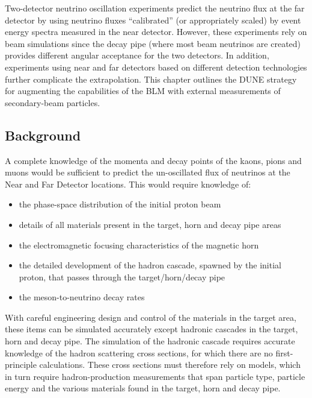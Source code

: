 Two-detector neutrino oscillation experiments predict the neutrino
flux at the far detector by using neutrino fluxes ``calibrated'' (or
appropriately scaled) by event energy spectra measured in the near
detector. However, these experiments rely on beam simulations since
the decay pipe (where most beam neutrinos are created) provides
different angular acceptance for the two detectors. In addition,
experiments using near and far detectors based on different detection
technologies further complicate the extrapolation. This chapter
outlines the DUNE strategy for augmenting the capabilities of the BLM
with external measurements of secondary-beam particles.

\subsection{Background}

A complete knowledge of the momenta and decay points of the kaons, pions and
muons would be sufficient to  predict the un-oscillated flux of neutrinos
at the Near and Far Detector locations. This would require knowledge of:

\begin{itemize}
\item the phase-space distribution of the initial proton beam
\item details of all materials present in the target, horn and decay pipe areas
\item  the electromagnetic focusing characteristics of the magnetic horn
\item the detailed development of the hadron cascade, spawned by the
initial proton, that passes through the target/horn/decay pipe
\item the meson-to-neutrino decay rates
\end{itemize}

With careful engineering design and control of the materials in the target
area, these items can be simulated accurately except hadronic cascades in
the target, horn and decay pipe. The simulation of the hadronic cascade requires
accurate knowledge of the hadron scattering cross sections, for which there are no
first-principle calculations. These cross sections must therefore rely on models, which
in turn require hadron-production measurements that span particle type, particle
energy and the various materials found in the target, horn and decay pipe.

